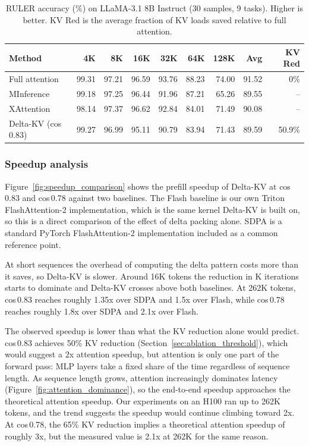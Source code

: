\begin{table}[!ht]
\centering
\caption{RULER accuracy (\%) on LLaMA-3.1 8B Instruct (30 samples, 9 tasks). Higher is better. KV Red is the average fraction of KV loads saved relative to full attention.}
\label{tab:ruler}
\begin{tabular}{lrrrrrrrr}
\toprule
Method & 4K & 8K & 16K & 32K & 64K & 128K & Avg & KV Red \\
\midrule
Full attention            & 99.31 & 97.21 & 96.59 & 93.76 & 88.23 & 74.00 & 91.52 & 0\%    \\
MInference                & 99.18 & 97.25 & 96.44 & 91.96 & 87.21 & 65.26 & 89.55 & --     \\
XAttention                & 98.14 & 97.37 & 96.62 & 92.84 & 84.01 & 71.49 & 90.08 & --     \\
Delta-KV (cos\,0.83)         & 99.27 & 96.99 & 95.11 & 90.79 & 83.94 & 71.43 & 89.59 & 50.9\% \\
\bottomrule
\end{tabular}
\end{table}

\subsubsection{Speedup analysis}

Figure~\ref{fig:speedup_comparison} shows the prefill speedup of Delta-KV at cos\,0.83 and cos\,0.78 against two baselines.
The Flash baseline is our own Triton FlashAttention-2 implementation, which is the same kernel Delta-KV is built on, so this is a direct comparison of the effect of delta packing alone.
SDPA is a standard PyTorch FlashAttention-2 implementation included as a common reference point.

At short sequences the overhead of computing the delta pattern costs more than it saves, so Delta-KV is slower.
Around 16K tokens the reduction in K iterations starts to dominate and Delta-KV crosses above both baselines.
At 262K tokens, cos\,0.83 reaches roughly 1.35x over SDPA and 1.5x over Flash, while cos\,0.78 reaches roughly 1.8x over SDPA and 2.1x over Flash.

The observed speedup is lower than what the KV reduction alone would predict.
cos\,0.83 achieves 50\% KV reduction (Section~\ref{sec:ablation_threshold}), which would suggest a 2x attention speedup, but attention is only one part of the forward pass: MLP layers take a fixed share of the time regardless of sequence length.
As sequence length grows, attention increasingly dominates latency (Figure~\ref{fig:attention_dominance}), so the end-to-end speedup approaches the theoretical attention speedup.
Our experiments on an H100 ran up to 262K tokens, and the trend suggests the speedup would continue climbing toward 2x.
At cos\,0.78, the 65\% KV reduction implies a theoretical attention speedup of roughly 3x, but the measured value is 2.1x at 262K for the same reason.

